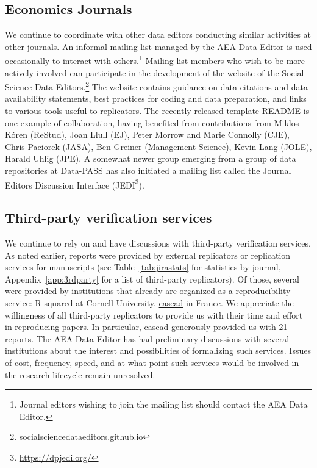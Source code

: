 \documentclass[PP]{AEA}
\newcommand{\urlcite}[2]{#2\footnote{\url{#1}}}
\newcommand{\purlcite}[2]{#2.\footnote{\url{#1}}}
\begin{document}
\subsection{Economics Journals}

We continue to coordinate with other data editors conducting similar activities at other journals. An informal mailing list managed by the AEA Data Editor is used occasionally to interact with others.\footnote{Journal editors wishing to join the mailing list should contact the AEA Data Editor.} Mailing list members who wish to be more actively involved can participate in the development of the \purlcite{socialsciencedataeditors.github.io}{website of the Social Science Data Editors} The website contains guidance on data citations and data availability statements, best practices for coding and data preparation, and links to various tools useful to replicators. The recently released template README is one example of collaboration, having benefited from contributions from Miklos Kóren (\acl{ReStud}), Joan Llull (\acl{EJ}), Peter Morrow and Marie Connolly (\acl{CJE}), Chris Paciorek (JASA), Ben Greiner (Management Science),  Kevin Lang (JOLE), Harald Uhlig (JPE). A somewhat newer group emerging from a group of data repositories at Data-PASS has also initiated a mailing list called the Journal Editors Discussion Interface (\urlcite{https://dpjedi.org/}{JEDI}).


\subsection{Third-party verification services}
\label{sec:3rdparty}


We continue to rely on and have discussions with third-party verification services. As noted earlier, \jiraexternal{} reports were provided by external replicators or replication services for \jiramcsexternal{} manuscripts (see Table~\ref{tab:jirastats} for statistics by journal, Appendix~\ref{app:3rdparty} for a list of third-party replicators). Of those, several were provided by institutions that already are organized as a reproducibility service: R-squared at Cornell University, \href{https://cascad.tech}{cascad} in France. We appreciate the willingness of all third-party replicators to provide us with their time and effort in reproducing papers. In particular, \href{https://cascad.tech}{cascad} generously provided us with 21 reports. The AEA Data Editor has had preliminary discussions with several institutions about the interest and possibilities of formalizing such services. Issues of cost, frequency, speed, and at what point such services would be involved in the research lifecycle remain unresolved. 
\end{document}
